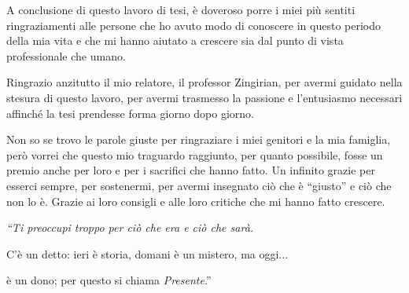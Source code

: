 
A conclusione di questo lavoro di tesi, è doveroso porre i miei più sentiti ringraziamenti alle persone che ho avuto modo di conoscere in questo periodo della mia vita e che mi hanno aiutato a crescere sia dal punto di vista professionale che umano.

Ringrazio anzitutto il mio relatore, il professor Zingirian, per avermi guidato nella stesura di questo lavoro, per avermi trasmesso la passione e l’entusiasmo necessari affinché la tesi prendesse forma giorno dopo giorno.

Non so se trovo le parole giuste per ringraziare i miei genitori e la mia famiglia, però vorrei che questo mio traguardo raggiunto, per quanto possibile, fosse un premio anche per loro e per i sacrifici che hanno fatto. Un infinito grazie per esserci sempre, per sostenermi, per avermi insegnato ciò che è “giusto” e ciò che non lo è. Grazie ai loro consigli e alle loro critiche che mi hanno fatto crescere.

\vspace{2.75em}

\hspace{\fill}\parbox{0.85\textwidth}{
	\centering
	\em
	``Ti preoccupi troppo per ciò che era e ciò che sarà.
	
	C'è un detto: ieri è storia, domani è un mistero, ma oggi...
	
	è un dono; per questo si chiama \emph{Presente}.''
}